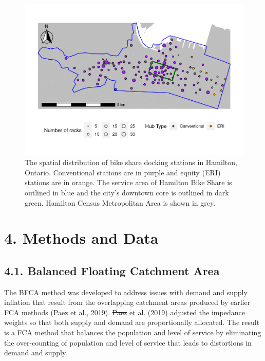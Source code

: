 \documentclass[]{elsarticle} %
\providecommand{\DIFaddtex}[1]{{\protect\color{blue}\uwave{#1}}} %
\providecommand{\DIFdeltex}[1]{{\protect\color{red}\sout{#1}}}                      %
\providecommand{\DIFaddbegin}{} %
\providecommand{\DIFaddend}{} %
\providecommand{\DIFdelbegin}{} %
\providecommand{\DIFdelend}{} %
\providecommand{\DIFaddbeginFL}{} %
\providecommand{\DIFaddendFL}{} %
\providecommand{\DIFdelbeginFL}{} %
\providecommand{\DIFdelendFL}{} %
\providecommand{\DIFadd}[1]{\texorpdfstring{\DIFaddtex{#1}}{#1}} %
\providecommand{\DIFdel}[1]{\texorpdfstring{\DIFdeltex{#1}}{}} %
\newcommand{\DIFscaledelfig}{0.5}
\newlength{\DIFdelgraphicswidth} %
\newlength{\DIFdelgraphicsheight} %
\newcommand{\DIFaddincludegraphics}[2][]{{\color{blue}\fbox{\DIFOincludegraphics[#1]{#2}}}} %
\newcommand{\DIFdelincludegraphics}[2][]{%
\sbox{\DIFdelgraphicsbox}{\DIFOincludegraphics[#1]{#2}}%
\settoboxwidth{\DIFdelgraphicswidth}{\DIFdelgraphicsbox} %
\settoboxtotalheight{\DIFdelgraphicsheight}{\DIFdelgraphicsbox} %
\scalebox{\DIFscaledelfig}{%
\parbox[b]{\DIFdelgraphicswidth}{\usebox{\DIFdelgraphicsbox}\\[-\baselineskip] \rule{\DIFdelgraphicswidth}{0em}}\llap{\resizebox{\DIFdelgraphicswidth}{\DIFdelgraphicsheight}{%
\setlength{\unitlength}{\DIFdelgraphicswidth}%
\begin{picture}(1,1)%
\thicklines\linethickness{2pt} %
{\color[rgb]{1,0,0}\put(0,0){\framebox(1,1){}}}%
{\color[rgb]{1,0,0}\put(0,0){\line( 1,1){1}}}%
{\color[rgb]{1,0,0}\put(0,1){\line(1,-1){1}}}%
\end{picture}%
}\hspace*{3pt}}} %
} %
\DeclareRobustCommand{\DIFaddbegin}{\DIFOaddbegin \let\includegraphics\DIFaddincludegraphics} %
\DeclareRobustCommand{\DIFaddend}{\DIFOaddend \let\includegraphics\DIFOincludegraphics} %
\DeclareRobustCommand{\DIFdelbegin}{\DIFOdelbegin \let\includegraphics\DIFdelincludegraphics} %
\DeclareRobustCommand{\DIFdelend}{\DIFOaddend \let\includegraphics\DIFOincludegraphics} %
\DeclareRobustCommand{\DIFaddbeginFL}{\DIFOaddbeginFL \let\includegraphics\DIFaddincludegraphics} %
\DeclareRobustCommand{\DIFaddendFL}{\DIFOaddendFL \let\includegraphics\DIFOincludegraphics} %
\DeclareRobustCommand{\DIFdelbeginFL}{\DIFOdelbeginFL \let\includegraphics\DIFdelincludegraphics} %
\DeclareRobustCommand{\DIFdelendFL}{\DIFOaddendFL \let\includegraphics\DIFOincludegraphics} %
\begin{document}
\begin{figure}

{\centering \DIFdelbeginFL %
\DIFdelendFL \DIFaddbeginFL \includegraphics[width=1\linewidth]{Bike-share-spatial-equity_files/figure-latex/sobi-stations-in-hamilton-1} 
\DIFaddendFL 

}

\caption{The spatial distribution of bike share docking stations in Hamilton, Ontario. Conventional stations are in purple and equity (ERI) stations are in orange. The service area of Hamilton Bike Share is outlined in blue and the city's downtown core is outlined in dark green. Hamilton Census Metropolitan Area is shown in grey.}\label{fig:sobi-stations-in-hamilton}
\end{figure}

\hypertarget{sec:methods}{%
\section{4. Methods and Data}\label{sec:methods}}

\hypertarget{balanced-floating-catchment-area}{%
\subsection{4.1. Balanced Floating Catchment
Area}\label{balanced-floating-catchment-area}}

The BFCA method was developed to address issues with demand and supply
inflation that result from the overlapping catchment areas produced by
earlier FCA methods (Paez et al., 2019). \DIFdelbegin \DIFdel{Paez }\DIFdelend \DIFaddbegin \DIFadd{Páez }\DIFaddend et al. (2019) adjusted the
impedance weights so that both supply and demand are proportionally
allocated. The result is a FCA method that balances the population and
level of service by eliminating the over-counting of population and
level of service that leads to distortions in demand and supply.
\end{document}
